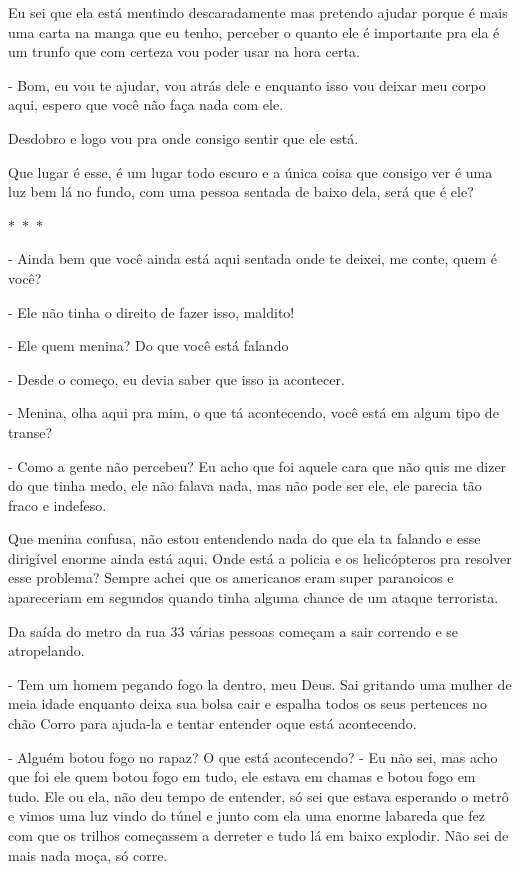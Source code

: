 Eu sei que ela está mentindo descaradamente mas pretendo ajudar porque é mais uma carta na manga que eu tenho, perceber o quanto ele é importante pra ela é um trunfo que com certeza vou poder usar na hora certa.

- Bom, eu vou te ajudar, vou atrás dele e enquanto isso vou deixar meu corpo aqui, espero que você não faça nada com ele.

Desdobro e logo vou pra onde consigo sentir que ele está.

Que lugar é esse, é um lugar todo escuro e a única coisa que consigo ver é uma luz bem lá no fundo, com uma pessoa sentada de baixo dela, será que é ele?

\begin{center}
	$\ast$~$\ast$~$\ast$
\end{center}

- Ainda bem que você ainda está aqui sentada onde te deixei, me conte, quem é você?

- Ele não tinha o direito de fazer isso, maldito!

- Ele quem menina? Do que você está falando

- Desde o começo, eu devia saber que isso ia acontecer.

- Menina, olha aqui pra mim, o que tá acontecendo, você está em algum tipo de transe?

- Como a gente não percebeu? Eu acho que foi aquele cara que não quis me dizer do que tinha medo, ele não falava nada, mas não pode ser ele, ele parecia tão fraco e indefeso.

Que menina confusa, não estou entendendo nada do que ela ta falando e esse dirigível enorme ainda está aqui. Onde está a policia e os helicópteros pra resolver esse problema? Sempre achei que os americanos eram super paranoicos e apareceriam em segundos quando tinha alguma chance de um ataque terrorista.

Da saída do metro da rua 33 várias pessoas começam a sair correndo e se atropelando.

- Tem um homem pegando fogo la dentro, meu Deus. Sai gritando uma mulher de meia idade enquanto deixa sua bolsa cair e espalha todos os seus pertences no chão
Corro para ajuda-la e tentar entender oque está acontecendo.

- Alguém botou fogo no rapaz? O que está acontecendo?
- Eu não sei, mas acho que foi ele quem botou fogo em tudo, ele estava em chamas e botou fogo em tudo. Ele ou ela, não deu tempo de entender, só sei que estava esperando o metrô e vimos uma luz vindo do túnel e junto com ela uma enorme labareda que fez com que os trilhos começassem a derreter e tudo lá em baixo explodir. Não sei de mais nada moça, só corre.